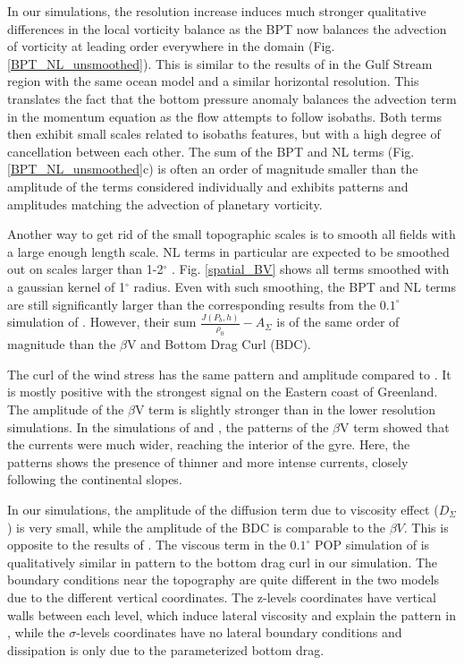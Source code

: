 \documentclass[11pt,a4paper]{article}
\begin{document}
In our simulations, the resolution increase induces much stronger qualitative differences in the local vorticity balance as the BPT now balances the advection of vorticity at leading order everywhere in the domain (Fig. \ref{BPT_NL_unsmoothed}). This is similar to the results of \citet{gula2015} in the Gulf Stream region with the same ocean model and a similar horizontal resolution. This translates the fact that the bottom pressure anomaly balances the advection term in the momentum equation as the flow attempts to follow isobaths. Both terms then exhibit small scales related to isobaths features, but with a high degree of cancellation between each other. The sum of the BPT and NL terms (Fig. \ref{BPT_NL_unsmoothed}c) is often an order of magnitude smaller than the amplitude of the terms considered individually  and exhibits patterns and amplitudes matching the advection of planetary vorticity.


Another way to get rid of the small topographic scales is to smooth all fields with a large enough length scale. NL terms in particular are expected to be smoothed out on scales larger than 1-2$^{\circ}$ \citep{hughes2001}. Fig. \ref{spatial_BV} shows all terms smoothed with a gaussian kernel of 1$^{\circ}$ radius. Even with such smoothing, the BPT and NL terms are still significantly larger than the corresponding results from the $0.1^{\circ}$ simulation of \citet{yeager2015}. However, their sum $\frac{J(P_b,h)}{\rho _0}-A_{\Sigma}$ is of the same order of magnitude than the $\beta$V and Bottom Drag Curl (BDC).

The curl of the wind stress has the same pattern and amplitude compared to \citet{yeager2015}. It is mostly positive with the strongest signal on the Eastern coast of Greenland. The amplitude of the $\beta$V term is slightly stronger than in the lower resolution simulations. In the simulations of \citet{hughes2001} and \citet{yeager2015}, the patterns of the $\beta$V term showed that the currents were much wider, reaching the interior of the gyre. Here, the patterns shows the presence of thinner and more intense currents, closely following the continental slopes.

In our simulations, the amplitude of the diffusion term due to viscosity effect ($D_{\Sigma}$) is very small, while the amplitude of the BDC is comparable to the $\beta V$. This is opposite to the results of \citet{yeager2015}. The viscous term in the $0.1^{\circ}$ POP simulation of \citet{yeager2015} is qualitatively similar in pattern  to the bottom drag curl in our simulation. The boundary conditions near the topography are quite different in the two models due to the different vertical coordinates. The z-levels coordinates have vertical walls between each level, which induce lateral viscosity and explain the pattern in \citet{yeager2015}, while the $\sigma$-levels coordinates have no lateral boundary conditions and dissipation is only due to the parameterized bottom drag. 
\end{document}
